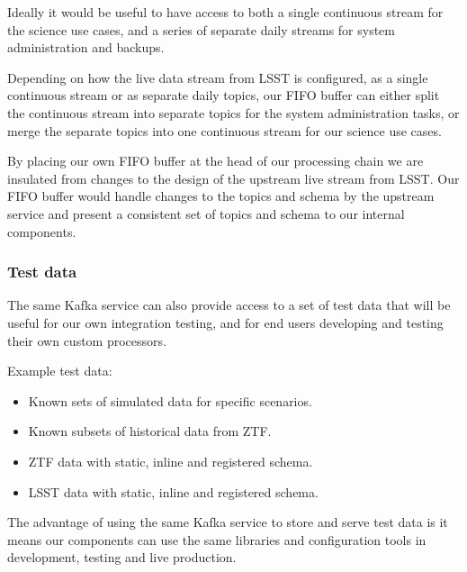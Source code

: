 \documentclass{article}
\newcommand{\kafka} {Kafka\xspace}
\newcommand{\fifo} {FIFO\xspace}
\newcommand{\ztf} {ZTF\xspace}
\newcommand{\lsst} {LSST\xspace}
\begin{document}
Ideally it would be useful to have access to both a single continuous stream for the science use cases, and a series of separate daily streams for system administration and backups.

Depending on how the live data stream from \lsst is configured, as a single continuous stream or as separate daily topics, our \fifo buffer can either split the continuous stream into separate topics for the system administration tasks, or merge the separate topics into one continuous stream for our science use cases.

By placing our own \fifo buffer at the head of our processing chain we are insulated from changes to the design of the upstream live stream from \lsst.
Our \fifo buffer would handle changes to the topics and schema by the upstream service and present a consistent set of topics and schema to our internal components.

\subsubsection{Test data}
\label{stage-1.test-data}
The same \kafka service can also provide access to a set of test data that will be useful for our own integration testing, and for end users developing and testing their own custom processors.

Example test data:
\begin{itemize}
  \item Known sets of simulated data for specific scenarios.
  \item Known subsets of historical data from \ztf.
  \item \ztf data with static, inline and registered schema.
  \item \lsst data with static, inline and registered schema.
\end{itemize}

The advantage of using the same \kafka service to store and serve test data is it means our components can use the same libraries and configuration tools in development, testing and live production.
\end{document}
